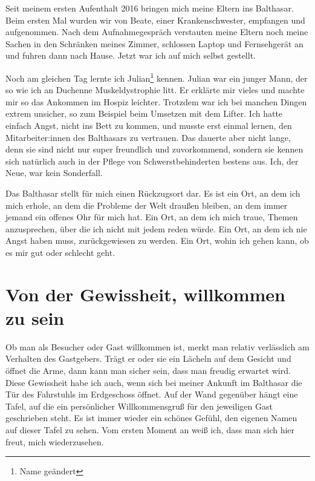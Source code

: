 \documentclass[fontsize=14pt,a4paper,headinclude,DIV=calc,automark]{scrbook}
\begin{document}
Seit meinem ersten Aufenthalt 2016 bringen mich meine Eltern ins Balthasar. Beim ersten Mal wurden wir von Beate, einer Krankenschwester, empfangen und aufgenommen. Nach dem Aufnahmegespräch verstauten meine Eltern noch meine Sachen in den Schränken meines Zimmer, schlossen Laptop und Fernsehgerät an und fuhren dann nach Hause. Jetzt war ich auf mich selbst gestellt.

Noch am gleichen Tag lernte ich Julian\footnote{Name geändert} kennen. Julian war ein junger Mann, der so wie ich an Duchenne Muskeldystrophie litt. Er erklärte mir vieles und machte mir so das Ankommen im Hospiz leichter. Trotzdem war ich bei manchen Dingen extrem unsicher, so zum Beispiel beim Umsetzen mit dem Lifter. Ich hatte einfach Angst, nicht ins Bett zu kommen, und musste erst einmal lernen, den Mitarbeiter:innen des Balthasars zu vertrauen. Das dauerte aber nicht lange, denn sie sind nicht nur super freundlich und zuvorkommend, sondern sie kennen sich natürlich auch in der Pflege von Schwerstbehinderten bestens aus. Ich, der Neue, war kein Sonderfall.

Das Balthasar stellt für mich einen Rückzugsort dar. Es ist ein Ort, an dem ich mich erhole, an dem die Probleme der Welt draußen bleiben, an dem immer jemand ein offenes Ohr für mich hat. Ein Ort, an dem ich mich traue, Themen anzusprechen, über die ich nicht mit jedem reden würde. Ein Ort, an dem ich nie Angst haben muss, zurückgewiesen zu werden. Ein Ort, wohin ich gehen kann, ob es mir gut oder schlecht geht.

\section{Von der Gewissheit, willkommen zu sein}

Ob man als Besucher oder Gast willkommen ist, merkt man relativ verlässlich am Verhalten des Gastgebers. Trägt er oder sie ein Lächeln auf dem Gesicht und öffnet die Arme, dann kann man sicher sein, dass man freudig erwartet wird. Diese Gewissheit habe ich auch, wenn sich bei meiner Ankunft im Balthasar die Tür des Fahrstuhls im Erdgeschoss öffnet. Auf der Wand gegenüber hängt eine Tafel, auf die ein persönlicher Willkommensgruß für den jeweiligen Gast geschrieben steht. Es ist immer wieder ein schönes Gefühl, den eigenen Namen auf dieser Tafel zu sehen. Vom ersten Moment an weiß ich, dass man sich hier freut, mich wiederzusehen.
\end{document}
